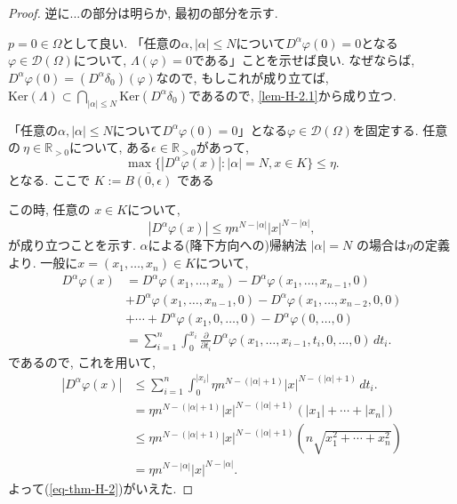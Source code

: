 \documentclass[dvipdfmx,a4paper,11pt]{article} %
\theoremstyle{definition}
\theoremstyle{remark}
\numberwithin{equation}{section}
\newcommand{\Ker}[1]{\mathrm{Ker}(#1)}
\begin{document}
\begin{proof}
逆に...の部分は明らか, 最初の部分を示す.  

\(p=0 \in \Omega\)として良い. 
「任意の\(\alpha, |\alpha|\le N\)について\(D^\alpha \varphi(0)=0\)となる$\varphi \in \mathcal{D}(\Omega)$について, 
\(\Lambda(\varphi)=0\)である」ことを示せば良い.
なぜならば, $D^\alpha \varphi(0)=(D^\alpha \delta_0)(\varphi)$なので, もしこれが成り立てば, \(\Ker{\Lambda} \subset \bigcap_{|\alpha|\le N} \Ker{D^\alpha \delta_0}\)であるので, \ref{lem-H-2.1}から成り立つ. 


「任意の\(\alpha, |\alpha|\le N\)について\(D^\alpha \varphi(0)=0\)」となる$\varphi \in \mathcal{D}(\Omega)$を固定する. 
任意の\(\ \eta \in \mathbb{R}_{>0}\)について, ある\( \epsilon \in \mathbb{R}_{>0}\)があって, 
\[
\max \{ |D^\alpha \varphi(x)| : |\alpha|=N, x \in K \} \le \eta.
\]
となる. ここで  \(K:=\overline{B(0,\epsilon)}\) である

この時, 任意の \( x \in K\)について, 
\begin{equation}
\label{eq-thm-H-2}
|D^\alpha \varphi(x)| \le \eta n^{N-|\alpha|} |x|^{N-|\alpha|},
\end{equation}
が成り立つことを示す. 
$\alpha$による(降下方向への)帰納法
 \(|\alpha|=N\) の場合は\(\eta\)の定義より.  
一般に\(x = (x_1,\dots,x_n) \in K\)について, 
\begin{align*}
D^\alpha \varphi(x) 
&= D^\alpha \varphi(x_1,\dots,x_n) - D^\alpha \varphi(x_1,\dots,x_{n-1},0) \\
&+ D^\alpha \varphi(x_1,\dots,x_{n-1},0) - D^\alpha \varphi(x_1,\dots,x_{n-2},0,0) \\
&+ \cdots + D^\alpha \varphi(x_1,0,\dots,0) - D^\alpha \varphi(0,\dots,0) \\
&= \sum_{i=1}^n \int^{x_i}_{0} \frac{\partial}{\partial t_i} D^\alpha \varphi(x_1,\dots,x_{i-1},t_i,0,\dots,0)\,dt_i.
\end{align*}
であるので, これを用いて, 
\begin{align*}
 |D^\alpha \varphi(x)| 
 &\le \sum_{i=1}^n \int^{|x_i|}_{0} \eta n^{N-(|\alpha|+1)} |x|^{N-(|\alpha|+1)} \,dt_i.\\
&= \eta n^{N-(|\alpha|+1)} |x|^{N-(|\alpha|+1)} (|x_1|+\cdots+|x_n|) \\
&\le \eta n^{N-(|\alpha|+1)} |x|^{N-(|\alpha|+1)} (n \sqrt{x_1^2+\cdots+x_n^2})\\
&=\eta n^{N-|\alpha|} |x|^{N-|\alpha|}.
\end{align*}
よって(\ref{eq-thm-H-2})がいえた. 


\end{proof}
\end{document}
